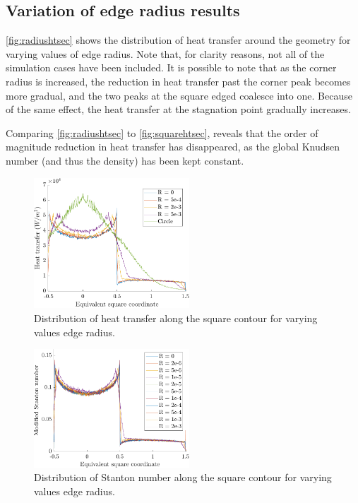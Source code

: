 \subsection{Variation of edge radius results}

\autoref{fig:radiushtsec} shows the distribution of heat transfer around the geometry for varying values of edge radius. Note that, for clarity reasons, not all of the simulation cases have been included. It is possible to note that as the corner radius is increased, the reduction in heat transfer past the corner peak becomes more gradual, and the two peaks at the square edged coalesce into one. Because of the same effect, the heat transfer at the stagnation point gradually increases.

Comparing \autoref{fig:radiushtsec} to \autoref{fig:squarehtsec}, reveals that the order of magnitude reduction in heat transfer has disappeared, as the global Knudsen number (and thus the density) has been kept constant.

\begin{figure}
    \centering
    \includegraphics[width=0.52\textwidth]{Images/4. Results/Radius/htsec.pdf}
    \caption{Distribution of heat transfer along the square contour for varying values edge radius.}
    \label{fig:radiushtsec}
\end{figure}

\begin{figure}
    \centering
    \includegraphics[width=0.52\textwidth]{Images/4. Results/Radius/stsec.pdf}
    \caption{Distribution of Stanton number along the square contour for varying values edge radius.}
    \label{fig:radiusstsec}
\end{figure}

